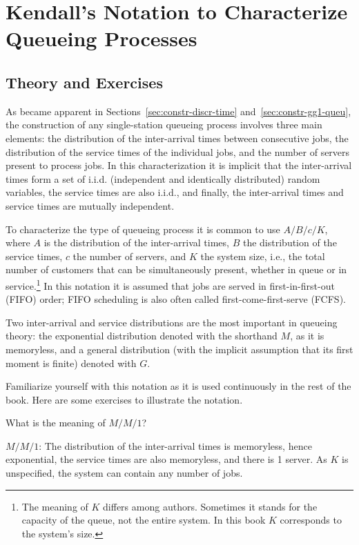 
\section{Kendall's Notation to Characterize Queueing Processes}
\label{sec:kendalls-notation}




\subsection*{Theory and Exercises}

As became apparent in Sections~\ref{sec:constr-discr-time}
and~\ref{sec:constr-gg1-queu}, the construction of any single-station queueing
process involves three main elements: 
the distribution of the
inter-arrival times between consecutive jobs, the distribution of the
service times of the individual jobs, and the number of servers
present to process jobs. In this characterization it is implicit that
the inter-arrival times form a set of i.i.d. (independent and
identically distributed) random variables, the service times are also
i.i.d., and finally, the inter-arrival times and service times are
mutually independent.

To characterize the type of queueing process it is common to use 
 $A/B/c/K$, where $A$ is the distribution of the
inter-arrival times, $B$ the distribution of the service times, $c$ the
number of servers, and $K$ the system size, i.e., the total number of customers that can be simultaneously present, whether in queue or in service.\footnote{The meaning of $K$ differs among authors. Sometimes it stands for
  the capacity of the queue, not the entire system. In this book $K$ corresponds to the system's size.}
In this notation it is assumed that jobs are served in
first-in-first-out (FIFO) order; FIFO scheduling is also often called
first-come-first-serve (FCFS). 

Two inter-arrival and service
distributions  are the most important in queueing theory: the
exponential distribution denoted with the shorthand $M$, as it is
memoryless, and a general distribution (with the implicit assumption
that its first moment is finite) denoted with $G$.

Familiarize yourself with this notation as it is used continuously in the rest of the book. Here are some exercises to illustrate the notation.

\begin{exercise}[\faPhoto]
  What is the meaning of $M/M/1$?
  \begin{solution}
$M/M/1$: The distribution of the inter-arrival times is
  memoryless, hence exponential, the service times are also
  memoryless, and there is 1 server. As $K$ is unspecified, the system can contain any number of jobs.
  \end{solution}
\end{exercise}

